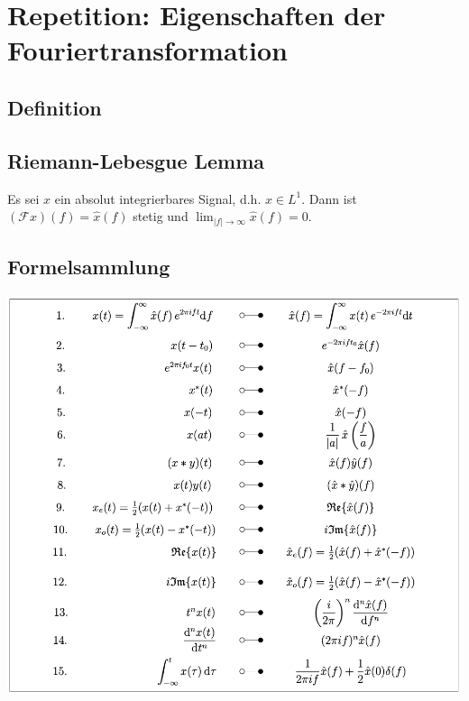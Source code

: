 \documentclass[11pt]{article}
\begin{document}
\vfill \null
\pagebreak

\section*{Repetition: Eigenschaften der Fouriertransformation}
\vspace*{-0.5cm}
\subsection*{Definition}
\vspace*{-0.5cm}
%

\vspace*{-0.5cm}
\subsection*{Riemann-Lebesgue Lemma}
\vspace*{-0.5cm}
Es sei $x$ ein absolut integrierbares Signal, d.h. $x \in L^1$. Dann ist $(\mathcal{F}x)(f) = \hat{x}(f)$ stetig und $\displaystyle\lim_{|f| \to \infty} \hat{x}(f) = 0$.

\subsection*{Formelsammlung}
\begin{center}
    \includegraphics[width=0.8\linewidth]{docimgs/FT_eigenschaften.png}
\end{center}
\end{document}
